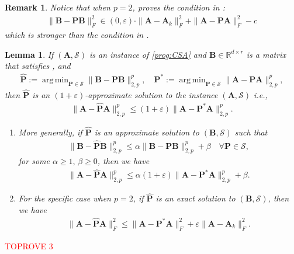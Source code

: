 \documentclass[11pt]{article}
\makeatletter
\DeclareMathOperator*{\argmin}{arg\,min}
\theoremstyle{plain}
\newtheorem{lemma}[theorem]{Lemma}
\newtheorem{remark}[theorem]{Remark}
\theoremstyle{plain}
\theoremstyle{definition}
\theoremstyle{plain}
\theoremstyle{remark}
\newenvironment{proof}[1][\protect\proofname]{\par
	\normalfont\topsep6\p@\@plus6\p@\relax
	\trivlist
	\itemindent\parindent
	\item[\hskip\labelsep\scshape #1]\ignorespaces
}{\endtrivlist\@endpefalse
}
\providecommand{\proofname}{Proof}
\newcommand{\RR}{\mathbb{R}}
\newcommand{\cS}{\mathcal{S}}
\makeatother
\begin{document}
\begin{remark}
\label{rem:stronger_PCPS_p=2}
    Notice that when $p=2$,  proves the condition in :
    \begin{align*}
\|\bm{B}-\bm{P}\bm{B}\|_F^2 \in (0,\varepsilon)\cdot\|\bm{A}-\bm{A}_k\|_F^2+ \|\bm{A}-\bm{P}\bm{A}\|_F^2 -c        
    \end{align*}
    which is stronger than the condition in .
\end{remark} 
\begin{lemma}
    \label{lem:approximate_soln}
    If $(\bm{A}, \cS)$ is an instance of \ref{prog:CSA} and $\bm{B}\in \RR^{d\times r}$ is a matrix that satisfies , and  
    \begin{align}
        \widehat{\bm{P}}:= \argmin_{\bm{P}\in \cS}\|\bm{B}-\bm{P}\bm{B}\|_{2,p}
^p ,\quad \bm{P}^*:= \argmin_{\bm{P}\in \cS}\|\bm{A}-\bm{P}\bm{A}\|_{2,p}
^p,
\end{align}
then $\widehat{\bm{P}}$ is an $(1+\varepsilon)$-approximate solution to the instance $(\bm{A}, \cS)$ i.e.,
\begin{align}
   \|\bm{A}-\widehat{\bm{P}}\bm{A}\|_{2,p}
^p\leq (1+\varepsilon)\|\bm{A}-\bm{P}^*\bm{A}\|_{2,p}
^p.
\end{align}
\begin{enumerate}
    \item More generally, if $\widehat{\bm{P}}$ is an approximate solution to $(\bm{B}, \cS)$ such that 
\begin{align*}
    \|\bm{B}-\widehat{\bm{P}}\bm{B}\|_{2,p}^p \leq \alpha \|\bm{B}-\bm{P}\bm{B}\|_{2,p}^p +\beta \quad \forall \bm{P} \in \cS,
\end{align*}
 for some $\alpha\geq 1,\, \beta\geq 0$, then we have 
\begin{align*}
    \|\bm{A}-\widehat{\bm{P}}\bm{A}\|_{2,p}
^p \leq \alpha(1+\varepsilon)\|\bm{A}-\bm{P}^*\bm{A}\|_{2,p}^p + \beta.
\end{align*}
\item For the specific case when $p=2$, if $\widehat{\bm{P}}$ is an exact solution to $(\bm{B}, \cS)$, then we have 
\begin{align*}
     \|\bm{A}-\widehat{\bm{P}}\bm{A}\|_F^2
 \leq \|\bm{A}-\bm{P}^*\bm{A}\|_F^2 + \varepsilon\|\bm{A}-\bm{A}_k\|_F^2.
\end{align*}
\end{enumerate}

\end{lemma}
\begin{proof}\textcolor{red}{TOPROVE 3}\end{proof}
\end{document}
